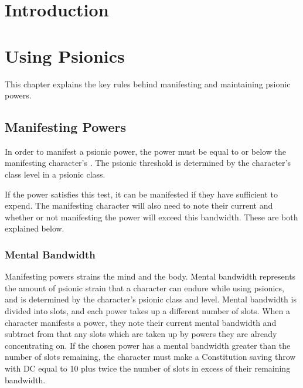 



\frontmatter
\maketitle
\tableofcontents

\mainmatter%

\chapter{Introduction}

\chapter{Using Psionics}
This chapter explains the key rules behind manifesting and
maintaining psionic powers.

\section{Manifesting Powers}
In order to manifest a psionic power,
the power must be equal to or below the manifesting character's
.
The psionic threshold is determined by the character's class level
in a psionic class.

If the power satisfies this test,
it can be manifested if they have sufficient 
to expend.
The manifesting character will also need to note their
current  and whether or not manifesting
the power will exceed this bandwidth.
These are both explained below.

\subsection{Mental Bandwidth}
Manifesting powers strains the mind and the body.
Mental bandwidth represents the amount of psionic strain that
a character can endure while using psionics,
and is determined by the character's psionic class and level.
Mental bandwidth is divided into slots,
and each power takes up a different number of slots.
When a character manifests a power,
they note their current mental bandwidth and subtract from that
any slots which are taken up by powers they are already concentrating on.
If the chosen power has a mental bandwidth
greater than the number of slots remaining,
the character must make a Constitution saving throw
with DC equal to 10
plus twice the number of slots in excess of their remaining bandwidth.

